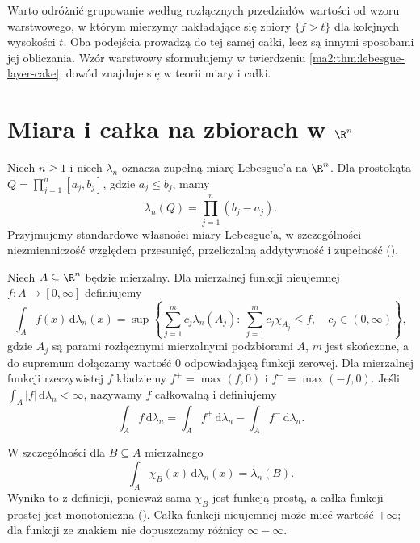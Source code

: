Warto odróżnić grupowanie według rozłącznych
przedziałów wartości od wzoru warstwowego,
w którym mierzymy nakładające się zbiory
$\{f>t\}$ dla kolejnych wysokości $t$.
Oba podejścia prowadzą do tej samej
całki, lecz są innymi sposobami jej obliczania.
Wzór warstwowy sformułujemy w twierdzeniu
\ref{ma2:thm:lebesgue-layer-cake}; dowód znajduje
się w teorii miary i całki.

\section{Miara i całka na zbiorach w \texorpdfstring{$\R^n$}{R\textasciicircum n}}

Niech $n\ge1$ i niech $\lambda_n$ oznacza
zupełną miarę Lebesgue'a na $\R^n$.
Dla prostokąta $Q=\prod_{j=1}^n[a_j,b_j]$,
gdzie $a_j\le b_j$, mamy
\[
 \lambda_n(Q)=\prod_{j=1}^n(b_j-a_j).
\]
Przyjmujemy standardowe własności miary
Lebesgue'a, w szczególności niezmienniczość
względem przesunięć, przeliczalną addytywność
i zupełność
().

\begin{definicja}
\label{ma2:def:lebesgue-domain-integral}
Niech $A\subseteq\R^n$ będzie mierzalny.
Dla mierzalnej funkcji nieujemnej
$f:A\to[0,\infty]$ definiujemy
\[
 \int_A f(x)\,\mathrm d\lambda_n(x)
 =\sup\left\{
 \sum_{j=1}^m c_j\lambda_n(A_j):
 \ \sum_{j=1}^m c_j\chi_{A_j}\le f,\quad
 c_j\in(0,\infty)
 \right\},
\]
gdzie $A_j$ są parami rozłącznymi
mierzalnymi podzbiorami $A$, $m$ jest
skończone, a do supremum dołączamy wartość
$0$ odpowiadającą funkcji zerowej.
Dla mierzalnej funkcji rzeczywistej $f$
kładziemy $f^+=\max(f,0)$ i $f^-=\max(-f,0)$.
Jeśli $\int_A |f|\,\mathrm d\lambda_n<\infty$,
nazywamy $f$ całkowalną i definiujemy
\[
 \int_A f\,\mathrm d\lambda_n
 =\int_A f^+\,\mathrm d\lambda_n
  -\int_A f^-\,\mathrm d\lambda_n.
\]
\end{definicja}

W szczególności dla $B\subseteq A$ mierzalnego
\[
 \int_A\chi_B(x)\,\mathrm d\lambda_n(x)=\lambda_n(B).
\]
Wynika to z definicji, ponieważ sama
$\chi_B$ jest funkcją prostą, a całka funkcji
prostej jest monotoniczna
().
Całka funkcji nieujemnej może mieć wartość
$+\infty$; dla funkcji ze znakiem nie
dopuszczamy różnicy $\infty-\infty$.

